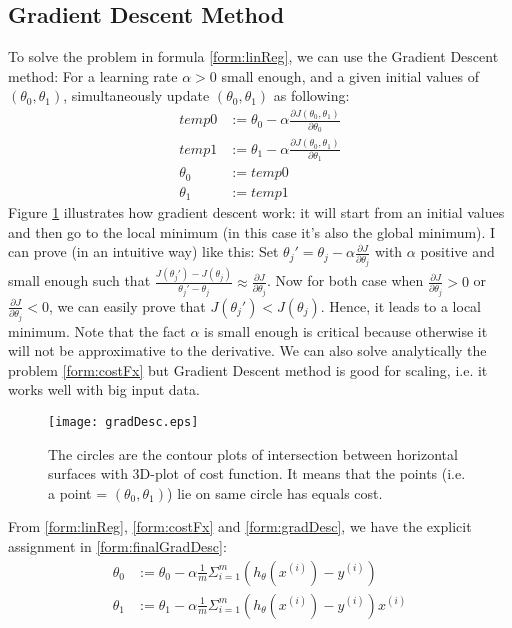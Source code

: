 \subsection{Gradient Descent Method}
To solve the problem in formula \eqref{form:linReg}, we can use the Gradient Descent method: For a learning rate $\alpha > 0$ small enough, and a given initial values of $(\theta_0, \theta_1)$, simultaneously update $(\theta_0, \theta_1)$ as following:
\begin{align}
\label{form:gradDesc}
temp0 &:= \theta_0 - \alpha \frac{\partial J(\theta_0, \theta_1)}{\partial \theta_0} \nonumber \\
temp1 &:= \theta_1 - \alpha \frac{\partial J(\theta_0, \theta_1)}{\partial \theta_1} \\
\theta_0 &:= temp0 \nonumber\\
\theta_1 &:= temp1 \nonumber
\end{align}
Figure \ref{fig:gradDesc} illustrates how gradient descent work: it will start from an initial values and then go to the local minimum (in this case it's also the global minimum). I can prove (in an intuitive way) like this: Set $\theta_{j}' = \theta_j - \alpha \frac{\partial J}{\partial \theta_j}$ with $\alpha$ positive and small enough such that $\frac{J(\theta_{j}') - J(\theta_j)}{\theta_{j}' - \theta_j} \approx \frac{\partial J}{\partial \theta_j}$. Now for both case when $\frac{\partial J}{\partial \theta_j} > 0$ or $\frac{\partial J}{\partial \theta_j} < 0$, we can easily prove that $J(\theta_{j}') < J(\theta_j)$. Hence, it leads to a local minimum. Note that the fact $\alpha$ is small enough is critical because otherwise it will not be approximative to the derivative. We can also solve  analytically the problem \eqref{form:costFx} but Gradient Descent method is good for scaling, i.e. it works well with big input data.  
\begin{figure}[!ht]
\centering
\texttt{[image: gradDesc.eps]}
\caption[Gradient Descent Illustration]{The circles are the contour plots of intersection between horizontal surfaces with 3D-plot of cost function. It means that the points (i.e. a point = $(\theta_0, \theta_1)$) lie on same circle has equals cost.}
\label{fig:gradDesc}
\end{figure}

From \eqref{form:linReg}, \eqref{form:costFx} and \eqref{form:gradDesc}, we have the explicit assignment in \eqref{form:finalGradDesc}:
\begin{align}
\label{form:finalGradDesc}
\theta_0 &:= \theta_0 - \alpha \frac{1}{m} \Sigma_{i=1}^{m} (h_{\theta}(x^{(i)}) - y^{(i)}) \nonumber \\
\theta_1 &:= \theta_1 - \alpha \frac{1}{m} \Sigma_{i=1}^{m} (h_{\theta}(x^{(i)}) - y^{(i)})x^{(i)} 
\end{align}
